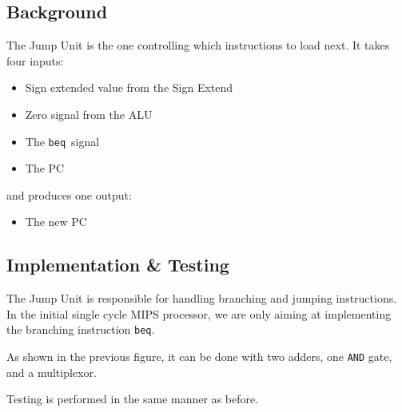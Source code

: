 \documentclass{beamer}
\begin{document}
\subsection{Background}
\begin{frame}
    The Jump Unit is the one controlling which instructions to load next. It
    takes four inputs:
    \begin{itemize}
        \item Sign extended value from the Sign Extend
        \item Zero signal from the ALU
        \item The \texttt{beq} signal
        \item The PC
    \end{itemize}
    and produces one output:
    \begin{itemize}
        \item The new PC
    \end{itemize}
\end{frame}
\begin{frame}
    \begin{figure}
        \centering
    \end{figure}
\end{frame}
\subsection{Implementation \& Testing}
\begin{frame}
    The Jump Unit is responsible for handling branching and jumping
    instructions. In the initial single cycle MIPS processor, we are only
    aiming at implementing the branching instruction \texttt{beq}.

    \vspace{\baselineskip}
    As shown in the previous figure, it can be done with two adders, one
    \texttt{AND} gate, and a multiplexor.

    \vspace{\baselineskip}
    Testing is performed in the same manner as before.
\end{frame}
\end{document}
